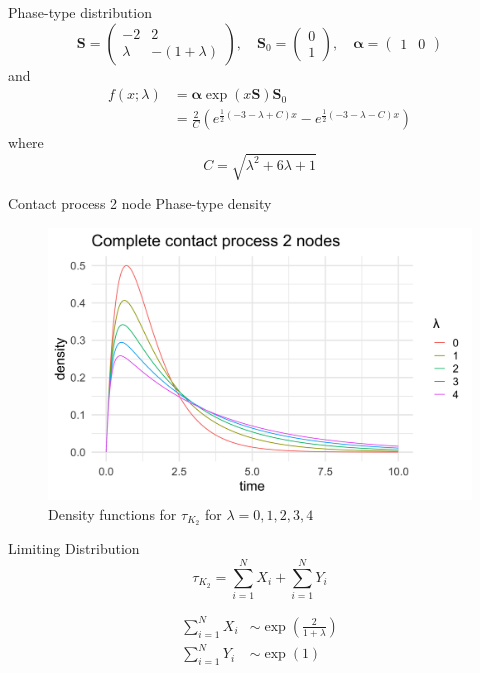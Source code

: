 \documentclass{beamer}
\theoremstyle{definition}
\begin{document}
\begin{frame}{Phase-type distribution}
$$
    \mathbf{S} = \begin{pmatrix}
        -2 & 2\\
        \lambda & - (1 + \lambda)
    \end{pmatrix}, \quad
    \mathbf{S}_0 = \begin{pmatrix}
        0\\
        1
    \end{pmatrix}, \quad
    \boldsymbol{\alpha} = \begin{pmatrix}
    1 & 0
    \end{pmatrix}
$$
and
\begin{align*}
 f(x; \lambda) &= \boldsymbol{\alpha} \exp(x \mathbf{S}) \mathbf{S}_0\\
 &= \frac{2}{C} \left( e^{\frac{1}{2}(-3 - \lambda + C) x} - e^{\frac{1}{2}(-3 - \lambda - C) x} \right)
\end{align*}
where
$$
C = \sqrt{\lambda^2 + 6 \lambda + 1}
$$
\end{frame}

\begin{frame}{Contact process 2 node Phase-type density}
\begin{figure}[H]
  \centering
    \includegraphics[width=.80\textwidth]{figures/complete_2_contact_phase_densities.png}
   \caption{Density functions for $\tau_{K_2}$ for $\lambda = 0, 1, 2, 3, 4$}
  \label{fig:contact_2_phase_densities}
\end{figure}
\end{frame}

\begin{frame}{Limiting Distribution}
$$
\tau_{K_2} = \sum_{i = 1}^N X_i +  \sum_{i = 1}^N  Y_i
$$

\begin{align*}
    \sum_{i = 1}^N X_i &\sim \exp\left( \frac{2}{1 + \lambda} \right)\\
    \sum_{i = 1}^N Y_i &\sim \exp( 1 )
\end{align*}
\end{frame}



\end{document}
